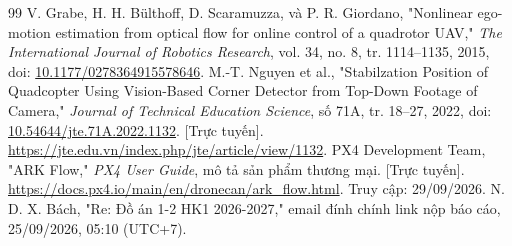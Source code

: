 \documentclass[a4paper,12pt]{article}
\begin{document}
\begin{thebibliography}{99}
 V. Grabe, H. H. Bülthoff, D. Scaramuzza, và P. R. Giordano, "Nonlinear ego-motion estimation from optical flow for online control of a quadrotor UAV," \textit{The International Journal of Robotics Research}, vol. 34, no. 8, tr. 1114–1135, 2015, doi: \href{https://doi.org/10.1177/0278364915578646}{10.1177/0278364915578646}.
 M.-T. Nguyen et al., "Stabilzation Position of Quadcopter Using Vision-Based Corner Detector from Top-Down Footage of Camera," \textit{Journal of Technical Education Science}, số 71A, tr. 18–27, 2022, doi: \href{https://doi.org/10.54644/jte.71A.2022.1132}{10.54644/jte.71A.2022.1132}. [Trực tuyến]. \url{https://jte.edu.vn/index.php/jte/article/view/1132}.
 PX4 Development Team, "ARK Flow," \textit{PX4 User Guide}, mô tả sản phẩm thương mại. [Trực tuyến]. \url{https://docs.px4.io/main/en/dronecan/ark_flow.html}. Truy cập: 29/09/2026.
 N. D. X. Bách, "Re: Đồ án 1-2 HK1 2026-2027," email đính chính link nộp báo cáo, 25/09/2026, 05:10 (UTC+7).
\end{thebibliography}
\endgroup
\end{document}
